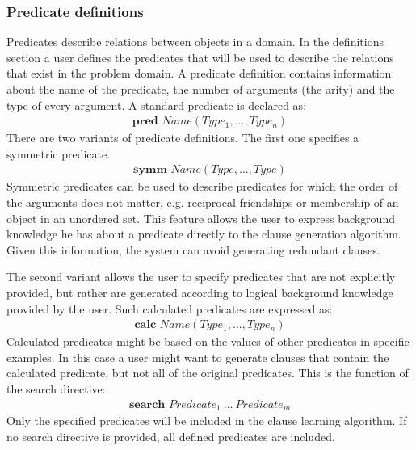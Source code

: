 \subsubsection{Predicate definitions}
Predicates describe relations between objects in a domain. In the definitions section a user defines the predicates that will be used to describe the relations that exist in the problem domain. A predicate definition contains information about the name of the predicate, the number of arguments (the arity) and the type of every argument. A standard predicate is declared as:
\begin{align*}
\textbf{pred } Name(Type_1, ..., Type_n)
\end{align*}
There are two variants of predicate definitions. The first one specifies a symmetric predicate.
\begin{align*}
\textbf{symm } Name(Type, ..., Type)
\end{align*}
Symmetric predicates can be used to describe predicates for which the order of the arguments does not matter, e.g. reciprocal friendships or membership of an object in an unordered set. This feature allows the user to express background knowledge he has about a predicate directly to the clause generation algorithm. Given this information, the system can avoid generating redundant clauses.

The second variant allows the user to specify predicates that are not explicitly provided, but rather are generated according to logical background knowledge provided by the user. Such calculated predicates are expressed as:
\begin{align*}
\textbf{calc } Name(Type_1, ..., Type_n)
\end{align*}
Calculated predicates might be based on the values of other predicates in specific examples. In this case a user might want to generate clauses that contain the calculated predicate, but not all of the original predicates. This is the function of the search directive: 
\begin{align*}
\textbf{search } Predicate_1\  ...\  Predicate_m
\end{align*}
Only the specified predicates will be included in the clause learning algorithm. If no search directive is provided, all defined predicates are included.

